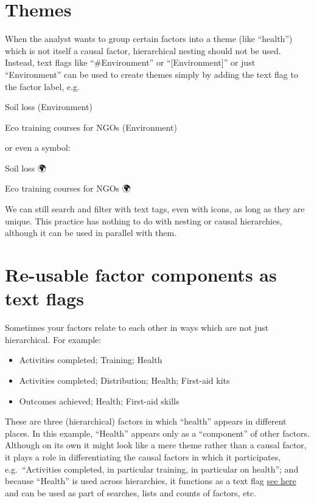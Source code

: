 \documentclass[
]{book}
\begin{document}
\hypertarget{themes}{%
\section{Themes}\label{themes}}

When the analyst wants to group certain factors into a theme (like ``health'') which is not itself a causal factor, hierarchical nesting should not be used. Instead, text flags like ``\#Environment'' or ``{[}Environment{]}'' or just ``Environment'' can be used to create themes simply by adding the text flag to the factor label, e.g.~

Soil loss (Environment)

Eco training courses for NGOs (Environment)

or even a symbol:

Soil loss 🌍

Eco training courses for NGOs 🌍

We can still search and filter with text tags, even with icons, as long as they are unique. This practice has nothing to do with nesting or causal hierarchies, although it can be used in parallel with them.

\hypertarget{re-usable-factor-components-as-text-flags}{%
\section{Re-usable factor components as text flags}\label{re-usable-factor-components-as-text-flags}}

Sometimes your factors relate to each other in ways which are not just hierarchical. For example:

\begin{itemize}
\item
  Activities completed; Training; Health
\item
  Activities completed; Distribution; Health; First-aid kits
\item
  Outcomes achieved; Health; First-aid skills
\end{itemize}

These are three (hierarchical) factors in which ``health'' appears in different places. In this example, ``Health'' appears only as a ``component'' of other factors. Although on its own it might look like a mere theme rather than a causal factor, it plays a role in differentiating the causal factors in which it participates, e.g.~``Activities completed, in particular training, in particular on health''; and because ``Health'' is used across hierarchies, it functions as a text flag \protect\hyperlink{using-flags-in-factor-labels}{see here} and can be used as part of searches, lists and counts of factors, etc.
\end{document}
